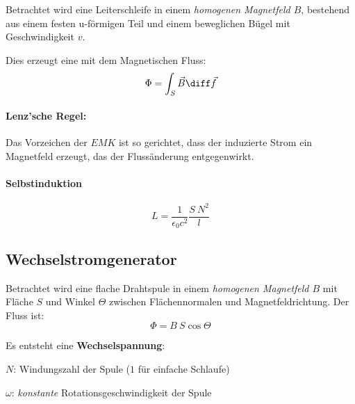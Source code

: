 		Betrachtet wird eine Leiterschleife in einem \emph{homogenen Magnetfeld $B$}, bestehend aus einem festen
		u-förmigen Teil und einem beweglichen Bügel mit Geschwindigkeit $v$.
		\begin{center}
			
		\end{center}
		Dies erzeugt eine
		mit dem Magnetischen Fluss:
		\begin{equation*}
			\Phi = \int_S \vec B \diff \vec f
		\end{equation*}
		
		\paragraph{Lenz'sche Regel:} %
			Das Vorzeichen der $EMK$ ist so gerichtet, dass der induzierte Strom ein Magnetfeld erzeugt, das der Flussänderung entgegenwirkt.
		
		\paragraph{Selbstinduktion} %
			\begin{equation*}
				L = \frac{1}{\epsilon_0 c^2} \frac{S\:N^2}{l}
			\end{equation*}
	\subsection{Wechselstromgenerator} %
		Betrachtet wird eine flache Drahtspule in einem \emph{homogenen Magnetfeld
		$B$} mit Fläche $S$ und Winkel $\Theta$ zwischen Flächennormalen und
		Magnetfeldrichtung. Der Fluss ist:
		\begin{equation*}
			\Phi = B\:S\cos\Theta
		\end{equation*}
		
		Es entsteht eine \textbf{Wechselspannung}:
		\begin{tightitemize}
			\item[$N$:] Windungszahl der Spule ($1$ für einfache Schlaufe)
			\item[$\omega$:] \emph{konstante} Rotationsgeschwindigkeit der Spule
		\end{tightitemize}
		
